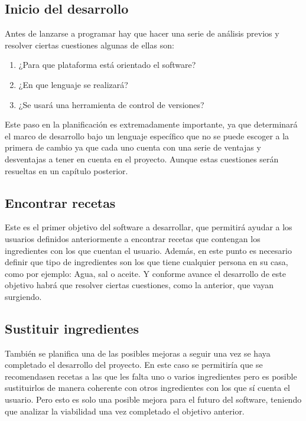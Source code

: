 \subsection{Inicio del desarrollo}
Antes de lanzarse a programar hay que hacer una serie de análisis previos y resolver ciertas cuestiones algunas de ellas son:
\begin{enumerate}
    \item ¿Para que plataforma está orientado el software?
    \item ¿En que lenguaje se realizará?
    \item ¿Se usará una herramienta de control de versiones?
\end{enumerate}
Este paso en la planificación es extremadamente importante, ya que determinará el marco de desarrollo bajo un lenguaje específico que no se puede escoger a la primera de cambio ya que cada uno cuenta con una serie de ventajas y desventajas a tener en cuenta en el proyecto. Aunque estas cuestiones serán resueltas en un capítulo posterior. 

\subsection{Encontrar recetas}
Este es el primer objetivo del software a desarrollar, que permitirá ayudar a los usuarios definidos anteriormente a encontrar recetas que contengan los ingredientes con los que cuentan el usuario. Además, en este punto es necesario definir que tipo de ingredientes son los que tiene cualquier persona en su casa, como por ejemplo: Agua, sal o aceite. Y conforme avance el desarrollo de este objetivo habrá que resolver ciertas cuestiones, como la anterior, que vayan surgiendo. 

\subsection{Sustituir ingredientes}
También se planifica una de las posibles mejoras a seguir una vez se haya completado el desarrollo del proyecto. En este caso se permitiría que se recomendasen recetas a las que les falta uno o varios ingredientes pero es posible sustituirlos de manera coherente con otros ingredientes con los que sí cuenta el usuario. Pero esto es solo una posible mejora para el futuro del software, teniendo que analizar la viabilidad una vez completado el objetivo anterior. 

